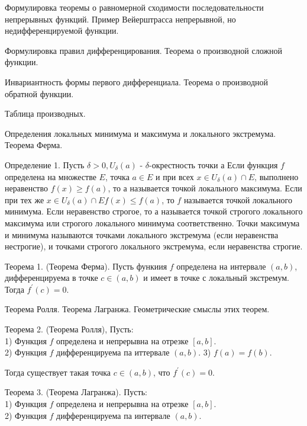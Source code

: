 \newpage
\begin{problem}
Формулировка теоремы о равномерной сходимости последовательности непрерывных
функций. Пример Вейерштрасса непрерывной, но недифференцируемой функции.
\end{problem}
\newpage
\begin{problem}
Формулировка правил дифференцирования. Теорема о производной сложной функции.
\end{problem}
\newpage
\begin{problem}
Инвариантность формы первого дифференциала. Теорема о производной обратной
функции.
\end{problem}
\newpage
\begin{problem}
Таблица производных.
\end{problem}
\newpage
\begin{problem}
Определения локальных минимума и максимума и локального экстремума. Теорема
Ферма.
\end{problem}
Определение 1. Пусть $\delta>0, U_\delta(a)$ - $\delta$-окрестность точки а Если функция $f$ определена на множестве $E$, точка $a \in E$ и при всех $x \in U_\delta(a) \cap E$, выполнено неравенство $f(x) \geq f(a)$, то а называется точкой локального максимума. Если при тех же $x \in U_\delta(a) \cap E f(x) \leq f(a)$, то $f$ называется точкой локального минимума. Если неравенство строгое, то а называется точкой строгого локального максимума или строгого локального минимума соответственно. Точки максимума и минимума называются точками локального экстремума (если неравенства нестрогие), и точками строгого локального экстремума, если неравенства строгие.

Теорема 1. (Теорема Ферма). Пусть функиия $f$ определена на интервале $(a, b)$, дифференцируема в точке $c \in(a, b)$ и имеет в точке с локальный экстремум. Тогда $f^{\prime}(c)=0$.

\newpage
\begin{problem}
Теорема Ролля. Теорема Лагранжа. Геометрические смыслы этих теорем.
\end{problem}
Теорема 2. (Теорема Ролля), Пусть:\\
1) Функция $f$ определена и непрерывна на отрезке $[a, b]$.\\
2) Функция $f$ дифференцируема па иттервале $(a, b)$.
3) $f(a)=f(b)$.

Тогда существует такая точка $c \in(a, b)$, что $f^{\prime}(c)=0$.

Теорема 3. (Теорема Лагранжа). Пусть:\\
1) Функция $f$ определена и непрерывна на отрезке $[a, b]$.\\
2) Функция $f$ дифференцируема па интервале $(a, b)$.

